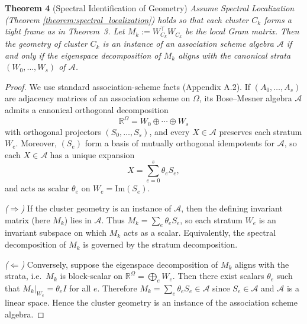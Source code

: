 \documentclass{article}
\theoremstyle{plain}
\numberwithin{equation}{section}
\theoremstyle{definition}
\theoremstyle{remark}
\begin{document}
\begin{lemmaproofbox}
\textbf{Theorem 4 }(Spectral Identification of Geometry)
\textit{Assume Spectral Localization (Theorem \ref{theorem:spectral_localization}) holds so that each cluster $C_k$ forms a tight frame as in Theorem~3.
Let $M_k := W_{C_k}^\top W_{C_k}$ be the local Gram matrix. Then the geometry of cluster $C_k$
is an instance of an association scheme algebra $\mathcal A$ if and only if the eigenspace
decomposition of $M_k$ aligns with the canonical strata $(W_0,\dots,W_s)$ of $\mathcal A$.}

\begin{proof}\label{theorem:spectral-identification}
We use standard association-scheme facts (Appendix A.2). If $(A_0,\dots,A_s)$ are adjacency matrices of an
association scheme on $\Omega$, its Bose--Mesner algebra $\mathcal A$ admits a canonical orthogonal decomposition
\[
\mathbb R^\Omega = W_0\oplus\cdots\oplus W_s
\]
with orthogonal projectors $(S_0,\dots,S_s)$, and every $X\in\mathcal A$ preserves each stratum $W_e$.
Moreover, $(S_e)$ form a basis of mutually orthogonal idempotents for $\mathcal A$, so each $X\in\mathcal A$
has a unique expansion
\[
X=\sum_{e=0}^s \theta_e S_e,
\]
and acts as scalar $\theta_e$ on $W_e=\mathrm{Im}(S_e)$.

\emph{($\Rightarrow$)} If the cluster geometry is an instance of $\mathcal A$, then the defining invariant matrix (here $M_k$) lies in $\mathcal A$.
Thus $M_k=\sum_e \theta_e S_e$, so each stratum $W_e$ is an invariant subspace on which $M_k$ acts as a scalar.
Equivalently, the spectral decomposition of $M_k$ is governed by the stratum decomposition.

\emph{($\Leftarrow$)} Conversely, suppose the eigenspace decomposition of $M_k$ aligns with the strata, i.e.\ $M_k$ is block-scalar on
$\mathbb R^\Omega=\bigoplus_e W_e$. Then there exist scalars $\theta_e$ such that $M_k|_{W_e}=\theta_e I$ for all $e$.
Therefore $M_k=\sum_e \theta_e S_e\in \mathcal A$ since $S_e\in\mathcal A$ and $\mathcal A$ is a linear space.
Hence the cluster geometry is an instance of the association scheme algebra.
\end{proof}
\end{lemmaproofbox}
\end{document}
